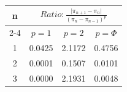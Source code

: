 \documentclass{article}
\providecommand{\abs}[1]{\lvert#1\rvert}
\begin{document}
\begin{tabular}{|c|c|c|c|}
\hline
\multirow{2}{*}{n} & \multicolumn{3}{|c|}{$Ratio:\displaystyle\frac{\abs{\pi_{n+1}-\pi_{n}}}{({\pi_{n}-\pi_{n-1}})^p}$} \\
\cline{2-4}
 & $p=1$ & $p=2$ & $p=\Phi$ \\
\hline
 1 & 0.0425 & 2.1172 & 0.4756 \\ 
  2 & 0.0001 & 0.1507 & 0.0101 \\ 
  3 & 0.0000 & 2.1931 & 0.0048 \\ 
 \hline 
\end{tabular}
\end{document}
